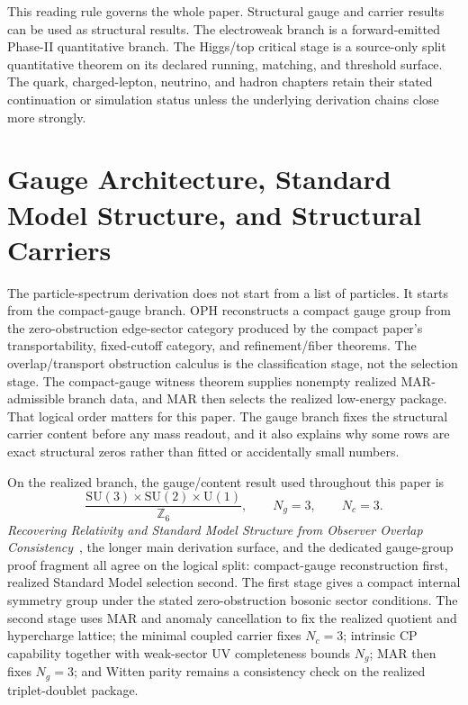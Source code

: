 \documentclass[11pt]{article}
\newcommand{\SU}{\mathrm{SU}}
\newcommand{\U}{\mathrm{U}}
\begin{document}
This reading rule governs the whole paper. Structural gauge and carrier results can be used
as structural results. The electroweak branch is a forward-emitted Phase-II
quantitative branch. The
Higgs/top critical stage is a source-only split quantitative theorem on its declared running, matching, and threshold surface. The quark,
charged-lepton, neutrino, and hadron chapters retain their stated continuation or
simulation status unless the underlying derivation chains close more strongly.

\section{Gauge Architecture, Standard Model Structure, and Structural Carriers}

The particle-spectrum derivation does not start from a list of particles. It starts from the
compact-gauge branch. OPH reconstructs a compact gauge
group from the zero-obstruction edge-sector category produced by the compact paper's
transportability, fixed-cutoff category, and refinement/fiber theorems. The overlap/transport obstruction calculus is the classification stage, not the selection stage. The compact-gauge witness theorem supplies nonempty realized MAR-admissible branch data, and MAR then selects the
realized low-energy package. That logical order matters for this paper. The
gauge branch fixes the structural carrier content before any mass readout, and it also explains
why some rows are exact structural zeros rather than fitted or accidentally small numbers.

On the realized branch, the gauge/content result used throughout this paper is
\[
\frac{\SU(3)\times\SU(2)\times\U(1)}{\mathbb Z_6},
\qquad
N_g=3,
\qquad
N_c=3.
\]
\emph{Recovering Relativity and Standard Model Structure from Observer Overlap Consistency}~\cite{ophcompact}, the longer main derivation surface, and the dedicated gauge-group proof
fragment all agree on the logical split: compact-gauge reconstruction first, realized Standard
Model selection second. The first stage gives a compact internal symmetry group under the stated
zero-obstruction bosonic sector conditions. The second stage uses MAR and anomaly cancellation to fix the realized
quotient and hypercharge lattice; the minimal coupled carrier fixes \(N_c=3\); intrinsic CP
capability together with weak-sector UV completeness bounds \(N_g\); MAR then fixes \(N_g=3\);
and Witten parity remains a consistency check on the realized triplet-doublet package.
\end{document}
